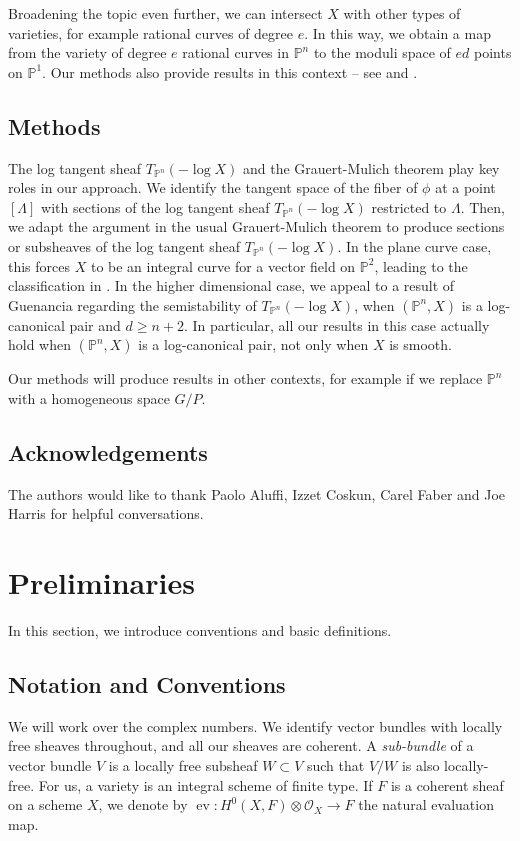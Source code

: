 \documentclass[11pt,reqno]{amsart}
\theoremstyle{plain}
\theoremstyle{definition}
\theoremstyle{remark}
\numberwithin{equation}{section}
\renewcommand{\to}{{\longrightarrow}}
\numberwithin{equation}{section}
\newcommand{\OO}{\mathscr{O}}
\newcommand{\PP}{\mathbb{P}}
\begin{document}
Broadening the topic even further, we can intersect $X$ with other types of varieties, for example rational curves of degree $e$.  In this way, we obtain a map from the variety of degree $e$ rational curves in $\PP^{n}$ to the moduli space of $ed$ points on $\PP^{1}$.  Our methods also provide results in this context -- see  and .

\subsection{Methods}
The log tangent sheaf $T_{\PP^n}(-\log X)$ and the Grauert-Mulich theorem play key roles in our approach. We identify the tangent space of the fiber of $\phi$ at a point $[\Lambda]$ with sections of the log tangent sheaf $T_{\PP^n}(-\log X)$ restricted to $\Lambda$. Then, we adapt the argument in the usual Grauert-Mulich theorem \cite[Theorem 2.1.4]{OSS80} to produce sections or subsheaves of the log tangent sheaf $T_{\PP^n}(-\log X)$. In the plane curve case, this forces $X$ to be an integral curve for a vector field on $\PP^2$,  leading to the classification in . In the higher dimensional case, we appeal to a result of Guenancia regarding the semistability of $T_{\PP^n}(-\log X)$, when $(\PP^n, X)$ is a log-canonical pair and $d\geq n+2$. In particular, all our results in this case actually hold when $(\PP^n, X)$ is a log-canonical pair, not only when $X$ is smooth.

Our methods will produce results in other contexts, for example if we replace $\PP^n$ with a homogeneous space $G/P$.


\subsection{Acknowledgements}
The authors would like to thank Paolo Aluffi, Izzet Coskun, Carel Faber and Joe Harris for helpful conversations.



\section{Preliminaries}
In this section, we introduce conventions and basic definitions.
\subsection{Notation and Conventions}
We will work over the complex numbers.  We identify vector bundles with locally free sheaves throughout, and all our sheaves are coherent.  A {\sl sub-bundle} of a vector bundle $V$ is a locally free subsheaf $W \subset V$ such that $V/W$ is also locally-free. For us, a variety is an integral scheme of finite type.  If $F$ is a coherent sheaf on a scheme $X$, we denote by $\operatorname{ev}: H^{0}(X,F) \otimes \OO_{X} \to F$ the natural evaluation map.
\end{document}
